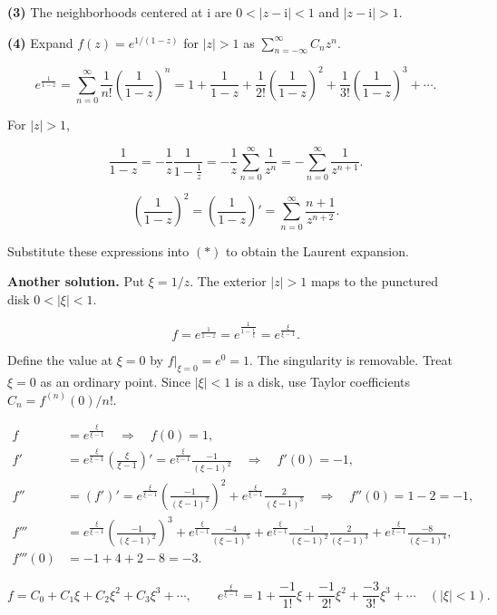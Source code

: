 \documentclass[11pt,a4paper]{article}
\theoremstyle{definition}
\theoremstyle{plain}
\begin{document}
\textbf{(3)} The neighborhoods centered at $\mathrm{i}$ are $0<|z-\mathrm{i}|<1$ and $|z-\mathrm{i}|>1$.

\textbf{(4)} Expand $f(z)=e^{1/(1-z)}$ for $|z|>1$ as $\sum_{n=-\infty}^{\infty}C_nz^n$.

\begin{equation*}
e^{\frac1{1-z}}
=\sum_{n=0}^{\infty}\frac1{n!}\left(\frac1{1-z}\right)^n
=1+\frac1{1-z}+\frac1{2!}\left(\frac1{1-z}\right)^2
+\frac1{3!}\left(\frac1{1-z}\right)^3+\cdots. \tag{*}
\end{equation*}

For $|z|>1$,

\[
\frac1{1-z}=-\frac1z\frac1{1-\frac1z}
=-\frac1z\sum_{n=0}^{\infty}\frac1{z^n}
=-\sum_{n=0}^{\infty}\frac1{z^{n+1}}.
\]

\[
\left(\frac1{1-z}\right)^2
=\left(\frac1{1-z}\right)'
=\sum_{n=0}^{\infty}\frac{n+1}{z^{n+2}}.
\]

Substitute these expressions into $(*)$ to obtain the Laurent expansion.

\textbf{Another solution.} Put $\xi=1/z$. The exterior $|z|>1$ maps to the punctured disk $0<|\xi|<1$.

\[
f=e^{\frac1{1-z}}=e^{\frac1{1-\frac1\xi}}=e^{\frac{\xi}{\xi-1}}.
\]

Define the value at $\xi=0$ by $f|_{\xi=0}=e^0=1$. The singularity is removable. Treat $\xi=0$ as an ordinary point. Since $|\xi|<1$ is a disk, use Taylor coefficients $C_n=f^{(n)}(0)/n!$.

\[
\begin{aligned}
f&=e^{\frac{\xi}{\xi-1}}\quad\Rightarrow\quad f(0)=1,\\
f'&=e^{\frac{\xi}{\xi-1}}\left(\frac{\xi}{\xi-1}\right)'
=e^{\frac{\xi}{\xi-1}}\frac{-1}{(\xi-1)^2}\quad\Rightarrow\quad f'(0)=-1,\\
f''&=(f')'=e^{\frac{\xi}{\xi-1}}\left(\frac{-1}{(\xi-1)^2}\right)^2+
e^{\frac{\xi}{\xi-1}}\frac{2}{(\xi-1)^3}
\quad\Rightarrow\quad f''(0)=1-2=-1,\\
f'''&=e^{\frac{\xi}{\xi-1}}\left(\frac{-1}{(\xi-1)^2}\right)^3
+e^{\frac{\xi}{\xi-1}}\frac{-4}{(\xi-1)^5}
+e^{\frac{\xi}{\xi-1}}\frac{-1}{(\xi-1)^2}\frac{2}{(\xi-1)^3}
+e^{\frac{\xi}{\xi-1}}\frac{-8}{(\xi-1)^4},\\
f'''(0)&=-1+4+2-8=-3.
\end{aligned}
\]

\[
f=C_0+C_1\xi+C_2\xi^2+C_3\xi^3+\cdots,
\qquad
e^{\frac{\xi}{\xi-1}}=1+\frac{-1}{1!}\xi+\frac{-1}{2!}\xi^2+\frac{-3}{3!}\xi^3+\cdots
\quad (|\xi|<1).
\]
\end{document}
